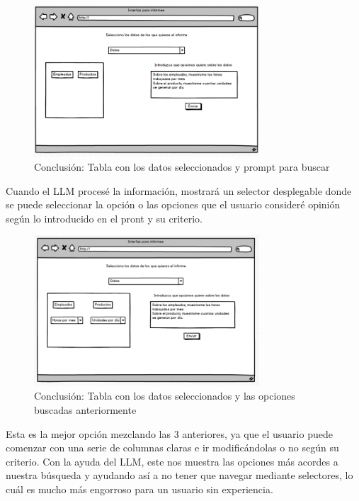 \begin{figure}[hp!]
    \centering
    \includegraphics[width=0.75\textwidth]{imaxes/iteracion1.7.png}
    \caption{Conclusión: Tabla con los datos seleccionados y prompt para buscar}
    \label{fig:iteracion1.7}
\end{figure}

Cuando el LLM procesé la información, mostrará un selector desplegable donde se puede seleccionar 
la opción o las opciones que el usuario consideré opinión según lo introducido en el pront y su criterio.

\begin{figure}[hp!]
    \centering
    \includegraphics[width=0.75\textwidth]{imaxes/iteracion1.8.png}
    \caption{Conclusión: Tabla con los datos seleccionados y las opciones buscadas anteriormente}
    \label{fig:iteracion1.8}
\end{figure}
  
Esta es la mejor opción mezclando las 3 anteriores, ya que el usuario puede comenzar 
con una serie de columnas claras e ir modificándolas o no según su criterio. Con la ayuda del LLM, 
este nos muestra las opciones más acordes a nuestra búsqueda y ayudando así a no tener que navegar mediante selectores, 
lo cuál es mucho más engorroso para un usuario sin experiencia.
  
